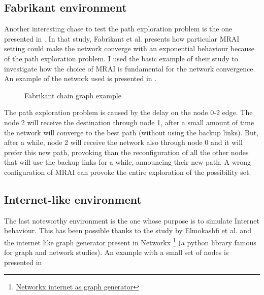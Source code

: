 \subsection{Fabrikant environment}
\label{subsec:fabrikant_env}

Another interesting chase to test the path exploration problem is the one
presented in \cite{fabrikant2011there}.
In that study, Fabrikant et al. presents how particular \ac{MRAI} setting could 
make the network converge with an exponential behaviour because of the path
exploration problem.
I used the basic example of their study to investigate how the choice of \ac{MRAI}
is fundamental for the network convergence.
An example of the network used is presented 
in .

\begin{figure}[h]                                                               
    \begin{center}                                                              
        
    \end{center}                                                                
    \caption{Fabrikant chain graph example}                                
    \label{fig:fabrikant_graph}
\end{figure}

The path exploration problem is caused by the delay on the node \num{0}-\num{2}
edge. The node 2 will receive the destination through node 1, after a small amount
of time the network will converge to the best path (without using the backup links).
But, after a while, node \num{2} will receive the network also through node \num{0}
and it will prefer this new path, provoking than the reconfiguration of all
the other nodes that will use the backup links for a while, announcing their 
new path.
A wrong configuration of \ac{MRAI} can provoke the entire exploration of the 
possibility set.

\subsection{Internet-like environment}
\label{subsec:internet_like_env}

The last noteworthy environment is the one whose purpose is to simulate Internet
behaviour.
This has been possible thanks to the study by Elmokashfi et al. \cite{elmokashfi2010scalability}
and the internet like graph generator present in Networkx \footnote{\href{https://networkx.org/documentation/stable/reference/generated/networkx.generators.internet_as_graphs.random_internet_as_graph.html\#networkx.generators.internet_as_graphs.random_internet_as_graph}{Networkx internet as graph generator}}
(a python library famous for graph and network studies).
An example with a small set of nodes is presented in 

